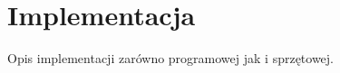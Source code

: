 \chapter{Implementacja}
\label{cha:Implementacja}
Opis implementacji zarówno programowej jak i sprzętowej.


